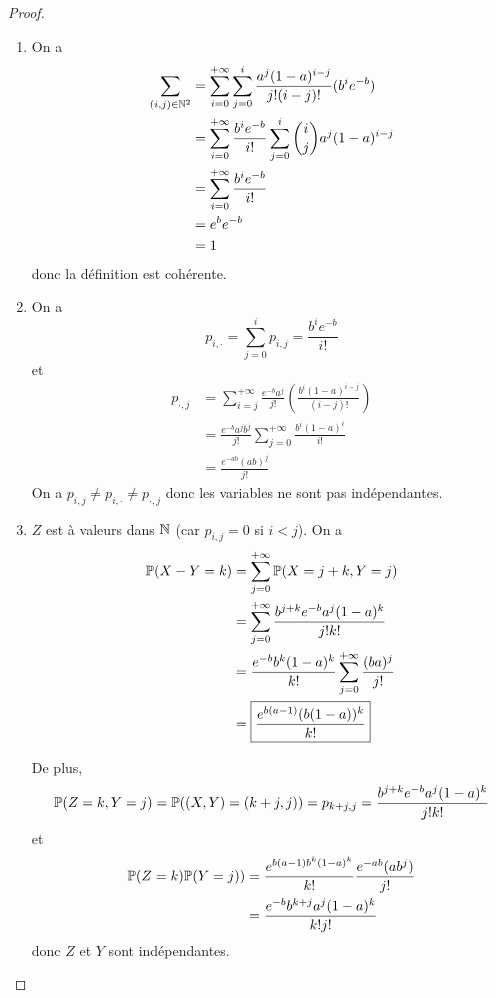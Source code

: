 \documentclass[12pt]{article}
\begin{document}
\begin{proof}
    \phantom{}
    \begin{enumerate}
        \item On a 
        \begin{align}
            \sum_{(i,j)\in\N^{2}}
            &=\sum_{i=0}^{+\infty}\sum_{j=0}^{i}\frac{a^{j}(1-a)^{i-j}}{j!(i-j)!}(b^{i}e^{-b})\\
            &=\sum_{i=0}^{+\infty}\frac{b^{i}e^{-b}}{i!}\sum_{j=0}^{i}\binom{i}{j}a^{j}(1-a)^{i-j}\\
            &=\sum_{i=0}^{+\infty}\frac{b^{i}e^{-b}}{i!}\\
            &=e^{b}e^{-b}\\
            &=1
        \end{align}
        donc la définition est cohérente.

        \item On a 
        \begin{equation}
            \boxed{p_{i,\cdot}=\sum_{j=0}^{i}p_{i,j}=\frac{b^{i}e^{-b}}{i!}}
        \end{equation}
        et 
        \begin{align}
            p_{\cdot,j}
            &=\sum_{i=j}^{+\infty}\frac{e^{-b}a^{j}}{j!}\left(\frac{b^{i}(1-a)^{i-j}}{(i-j)!}\right)\\
            &=\frac{e^{-b}a^{j}b^{j}}{j!}\sum_{j=0}^{+\infty}\frac{b^{i}(1-a)^{i}}{i!}\\
            &=\boxed{\frac{e^{-ab}(ab)^{j}}{j!}}
        \end{align}
        On a $p_{i,j}\neq p_{i,\cdot}\neq p_{\cdot,j}$ donc les variables ne sont pas indépendantes.

        \item $Z$ est à valeurs dans $\N$ (car $p_{i,j}=0$ si $i<j$). On a 
        \begin{align}
            \P(X-Y=k)
            &=\sum_{j=0}^{+\infty}\P(X=j+k,Y=j)\\
            &=\sum_{j=0}^{+\infty}\frac{b^{j+k}e^{-b}a^{j}(1-a)^{k}}{j!k!}\\
            &=\frac{e^{-b}b^{k}(1-a)^{k}}{k!}\sum_{j=0}^{+\infty}\frac{(ba)^{j}}{j!}\\
            &=\boxed{\frac{e^{b(a-1)}(b(1-a))^{k}}{k!}}
        \end{align}

        De plus,
        \begin{equation}
            \P(Z=k,Y=j)=\P((X,Y)=(k+j,j))=p_{k+j,j}=\frac{b^{j+k}e^{-b}a^{j}(1-a)^{k}}{j!k!}
        \end{equation}
        et
        \begin{align}
            \P(Z=k)\P(Y=j))
            &=\frac{e^{b(a-1)b^{k}(1-a)^{k}}}{k!}\frac{e^{-ab}(ab^{j})}{j!}\\
            &=\frac{e^{-b}b^{k+j}a^{j}(1-a)^{k}}{k!j!}
        \end{align}
        donc $Z$ et $Y$ sont indépendantes.
    \end{enumerate}
\end{proof}
\end{document}

